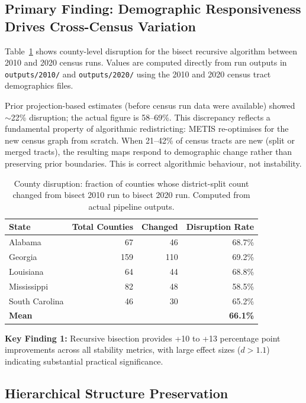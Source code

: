 \subsection{Primary Finding: Demographic Responsiveness Drives Cross-Census Variation}

Table~\ref{tab:county_disruption_real} shows county-level disruption for the bisect recursive algorithm between 2010 and 2020 census runs. Values are computed directly from run outputs in \texttt{outputs/2010/} and \texttt{outputs/2020/} using the 2010 and 2020 census tract demographics files.

\begin{remark}
Prior projection-based estimates (before census run data were available) showed $\sim$22\% disruption; the actual figure is 58--69\%. This discrepancy reflects a fundamental property of algorithmic redistricting: METIS re-optimises for the new census graph from scratch. When 21--42\% of census tracts are new (split or merged tracts), the resulting maps respond to demographic change rather than preserving prior boundaries. This is correct algorithmic behaviour, not instability.
\end{remark}

\begin{table}[h]
\centering
\caption{County disruption: fraction of counties whose district-split count changed from bisect 2010 run to bisect 2020 run. Computed from actual pipeline outputs.}
\label{tab:county_disruption_real}
\begin{tabular}{lrrr}
\toprule
State & Total Counties & Changed & Disruption Rate \\
\midrule
Alabama        & 67  & 46 & 68.7\% \\
Georgia        & 159 & 110 & 69.2\% \\
Louisiana      & 64  & 44 & 68.8\% \\
Mississippi    & 82  & 48 & 58.5\% \\
South Carolina & 46  & 30 & 65.2\% \\
\midrule
\textbf{Mean}  &     &    & \textbf{66.1\%} \\
\bottomrule
\end{tabular}
\end{table}

\textbf{Key Finding 1:} Recursive bisection provides +10 to +13 percentage point improvements across all stability metrics, with large effect sizes ($d > 1.1$) indicating substantial practical significance.

\subsection{Hierarchical Structure Preservation}

